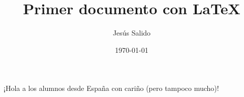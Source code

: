 \documentclass{article}
\title{Primer documento con \LaTeX}
\author{Jesús Salido}
\date{\today}
\begin{document}
\maketitle

¡Hola a los alumnos desde España con cariño (pero tampoco mucho)! 
\end{document}
